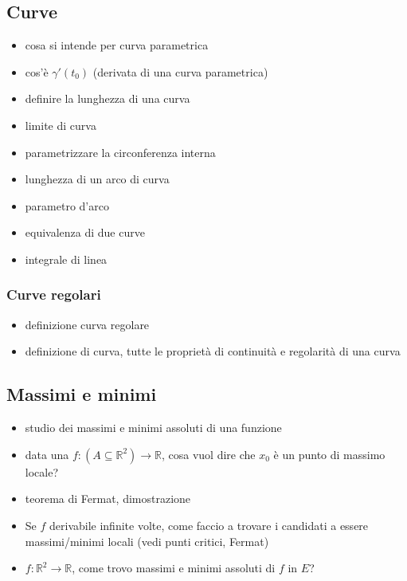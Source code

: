 \documentclass[11pt]{article}
\begin{document}
\subsection{Curve}
\label{sec:org0a3db65}
\begin{itemize}
\item cosa si intende per curva parametrica
\item cos'è \(\gamma'(t_0)\) (derivata di una curva parametrica)
\item definire la lunghezza di una curva
\item limite di curva
\item parametrizzare la circonferenza interna
\item lunghezza di un arco di curva
\item parametro d'arco
\item equivalenza di due curve
\item integrale di linea
\end{itemize}

\subsubsection{Curve regolari}
\label{sec:org41208d9}
\begin{itemize}
\item definizione curva regolare
\item definizione di curva, tutte le proprietà di continuità e regolarità di una curva
\end{itemize}

\subsection{Massimi e minimi}
\label{sec:org2c92753}
\begin{itemize}
\item studio dei massimi e minimi assoluti di una funzione
\item data una \(f : (A \subseteq \mathbb{R}^2) \to \mathbb{R}\), cosa vuol dire che \(x_0\) è un
punto di massimo locale?
\item teorema di Fermat, dimostrazione
\item Se \(f\) derivabile infinite volte, come faccio a trovare i candidati a essere
massimi/minimi locali (vedi punti critici, Fermat)
\item \(f : \mathbb{R}^2 \to \mathbb{R}\), come trovo massimi e minimi assoluti di \(f\) in \(E\)?
\end{itemize}
\end{document}
